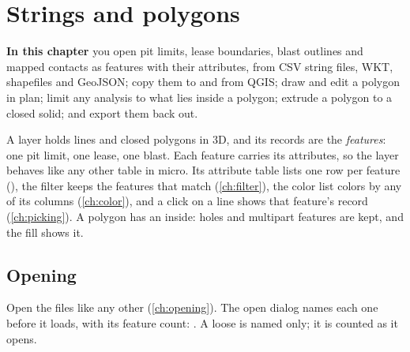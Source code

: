 \chapter{Strings and polygons}\label{ch:polygons}

\begin{goals}
\textbf{In this chapter} you open pit limits, lease boundaries, blast outlines and mapped contacts
as features with their attributes, from CSV string files, WKT, shapefiles and GeoJSON; copy them to
and from QGIS; draw and edit a polygon in plan; limit any analysis to what lies inside a polygon;
extrude a polygon to a closed solid; and export them back out.
\end{goals}

A  layer holds lines and
closed polygons in 3D, and its records are the \emph{features}: one pit limit, one lease, one blast.
Each feature carries its attributes, so the layer behaves like any other table in micro. Its
attribute table lists one row per feature (), the filter keeps the features that match
(\cref{ch:filter}), the color list colors by any of its columns (\cref{ch:color}), and a click on a
line shows that feature's record (\cref{ch:picking}). A polygon has an inside: holes and multipart
features are kept, and the fill shows it.


\section{Opening}\label{sec:polygons-open}

Open the files like any other (\cref{ch:opening}). The open dialog names each one before it loads,
with its feature count: . A loose  is named  only; it is counted as it opens.

